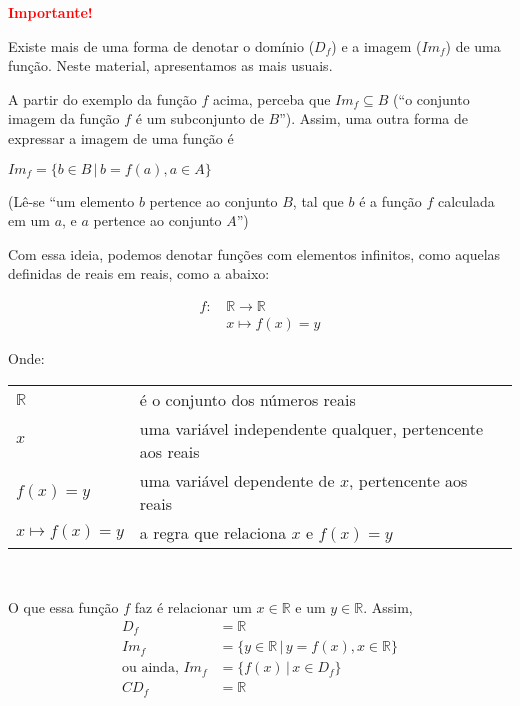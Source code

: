 \documentclass[12pt,openright,twoside,a4paper]{article}
\makeatletter
\theoremstyle{definition}
\newenvironment{condicoes}[1][Onde:]
{#1 \begin{tabular}[t]{>{$}l<{$} @{${} \implies {}$} l}}
	{\end{tabular}\\[\belowdisplayskip]}
\makeatother
\begin{document}
	\begin{snugshade}
		\textbf{\textcolor{red}{Importante!}}
		
		Existe mais de uma forma de denotar o domínio ($D_f$) e a imagem ($Im_f$) de uma função. Neste material, apresentamos as mais usuais.
		
		A partir do exemplo da função $f$ acima, perceba que $Im_f \subseteq B$ (``o conjunto imagem da função $f$ é um subconjunto de $B$''). Assim, uma outra forma de expressar a imagem de uma função é
		
		\begin{center}
			$Im_f = \{b \in B \,|\, b = f(a), a \in A\}$
			
			(Lê-se ``um elemento $b$ pertence ao conjunto $B$, tal que $b$ é a função $f$ calculada em um $a$, e $a$ pertence ao conjunto $A$'')
		\end{center}
		
		Com essa ideia, podemos denotar funções com elementos infinitos, como aquelas definidas de reais em reais, como a abaixo:
		
		\begin{align*}
			f:\, &\mathbb{R} \longrightarrow \mathbb{R}\\
			&x \mapsto f(x) = y
		\end{align*}
		
		
		\begin{condicoes}
			\mathbb{R} & é o conjunto dos números reais\\
			x & uma variável independente qualquer, pertencente aos reais\\
			f(x) = y & uma variável dependente de $x$, pertencente aos reais\\
			x \mapsto f(x) = y & a regra que relaciona $x$ e $f(x) = y$
		\end{condicoes}
		
		O que essa função $f$ faz é relacionar um $x \in \mathbb{R}$ e um $y \in \mathbb{R}$. Assim,
		\begin{align*}
			D_f &= \mathbb{R}\\
			Im_f &= \{y \in \mathbb{R} \,|\, y = f(x), x \in \mathbb{R}\}\\
			\text{ou ainda, } Im_f &= \{f(x) \,|\, x \in D_f\}\\
			CD_f &= \mathbb{R}
		\end{align*}
		
	\end{snugshade}
	
\end{document}
